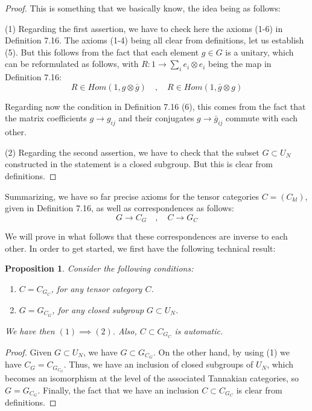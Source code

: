 \documentclass[12pt]{amsbook}
\newtheorem{proposition}[theorem]{Proposition}
\begin{document}
\begin{proof}
This is something that we basically know, the idea being as follows:

\medskip

(1) Regarding the first assertion, we have to check here the axioms (1-6) in Definition 7.16. The axioms (1-4) being all clear from definitions, let us establish (5). But this follows from the fact that each element $g\in G$ is a unitary, which can be reformulated as follows, with $R:1\to\sum_ie_i\otimes e_i$ being the map in Definition 7.16:
$$R\in Hom(1,g\otimes\bar{g})\quad,\quad 
R\in Hom(1,\bar{g}\otimes g)$$

Regarding now the condition in Definition 7.16 (6), this comes from the fact that the matrix coefficients $g\to g_{ij}$ and their conjugates $g\to\bar{g}_{ij}$ commute with each other.

\medskip

(2) Regarding the second assertion, we have to check that the subset $G\subset U_N$ constructed in the statement is a closed subgroup. But this is clear from definitions.
\end{proof}

Summarizing, we have so far precise axioms for the tensor categories $C=(C_{kl})$, given in Definition 7.16, as well as correspondences as follows:
$$G\to C_G\quad,\quad 
C\to G_C$$

We will prove in what follows that these correspondences are inverse to each other. In order to get started, we first have the following technical result:

\begin{proposition}
Consider the following conditions:
\begin{enumerate}
\item $C=C_{G_C}$, for any tensor category $C$.

\item $G=G_{C_G}$, for any closed subgroup $G\subset U_N$.
\end{enumerate}
We have then $(1)\implies(2)$. Also, $C\subset C_{G_C}$ is automatic.
\end{proposition}

\begin{proof}
Given $G\subset U_N$, we have $G\subset G_{C_G}$. On the other hand, by using (1) we have $C_G=C_{G_{C_G}}$. Thus, we have an inclusion of closed subgroups of $U_N$, which becomes an isomorphism at the level of the associated Tannakian categories, so $G=G_{C_G}$. Finally, the fact that we have an inclusion $C\subset C_{G_C}$ is clear from definitions.
\end{proof}
\end{document}
